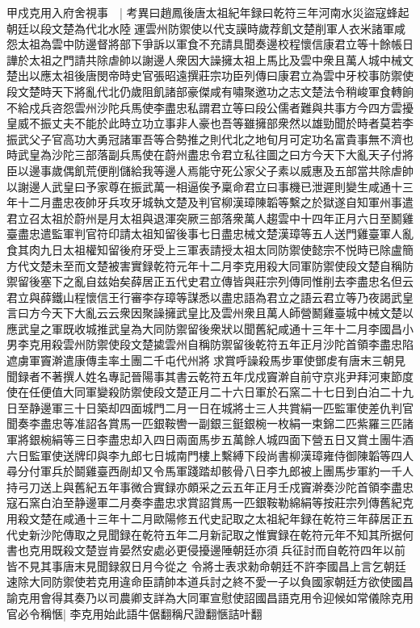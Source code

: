 甲戍克用入府舍視事　|{
	考異曰趙鳳後唐太祖紀年録曰乾符三年河南水災盜寇蜂起朝廷以段文楚為代北水陸運雲州防禦使以代支謨時歲荐飢文楚削軍人衣米諸軍咸怨太祖為雲中防邊督將部下爭訴以軍食不充請具聞奏邊校程懷信康君立等十餘帳日譁於太祖之門請共除虐帥以謝邊人衆因大譟擁太祖上馬比及雲中衆且萬人城中械文楚出以應太祖後唐閔帝時史官張昭遠撰莊宗功臣列傳曰康君立為雲中牙校事防禦使段文楚時天下將亂代北仍歲阻飢諸部豪傑咸有嘯聚邀功之志文楚法令稍峻軍食轉餉不給戍兵咨怨雲州沙陀兵馬使李盡忠私謂君立等曰段公儒者難與共事方今四方雲擾皇威不振丈夫不能於此時立功立事非人豪也吾等雖擁部衆然以雄勁聞於時者莫若李振武父子官高功大勇冠諸軍吾等合勢推之則代北之地旬月可定功名富貴事無不濟也時武皇為沙陀三部落副兵馬使在蔚州盡忠令君立私往圖之曰方今天下大亂天子付將臣以邊事歲偶飢荒便削儲給我等邊人焉能守死公家父子素以威惠及五部當共除虐帥以謝邊人武皇曰予家尊在振武萬一相逼俟予稟命君立曰事機已泄遲則變生咸通十三年十二月盡忠夜帥牙兵攻牙城執文楚及判官柳漢璋陳韜等繫之於獄遂自知軍州事遣君立召太祖於蔚州是月太祖與退渾突厥三部落衆萬人趨雲中十四年正月六日至鬭雞臺盡忠遣監軍判官符印請太祖知留後事七日盡忠械文楚漢璋等五人送門雞臺軍人亂食其肉九日太祖權知留後府牙受上三軍表請授太祖太同防禦使懿宗不悦時已除盧簡方代文楚未至而文楚被害實録乾符元年十二月李克用殺大同軍防禦使段文楚自稱防禦留後塞下之亂自兹始矣薛居正五代史君立傳皆與莊宗列傳同惟削去李盡忠名但云君立與薛鐵山程懷信王行審李存璋等謀悉以盡忠語為君立之語云君立等乃夜謁武皇言曰方今天下大亂云云衆因聚譟擁武皇比及雲州衆且萬人師營鬭雞臺城中械文楚以應武皇之軍既收城推武皇為大同防禦留後衆狀以聞舊紀咸通十三年十二月李國昌小男李克用殺雲州防禦使段文楚㨿雲州自稱防禦留後乾符五年正月沙陀首領李盡忠陷遮虜軍竇澣遣康傳圭率土團二千屯代州將求賞呼譟殺馬步軍使鄧䖍有唐末三朝見聞録者不著撰人姓名專記晉陽事其書云乾符五年戊戍竇澣自前守京兆尹拜河東節度使在任便值大同軍變殺防禦使段文楚正月二十六日軍於石窯二十七日到白泊二十九日至静邊軍三十日築却四面城門二月一日在城將士三人共賞絹一匹監軍使差仇判官聞奏李盡忠等准詔各賞馬一匹銀鞍轡一副銀三鋌銀椀一枚絹一束錦二匹紫羅三匹諸軍將銀椀絹等三日李盡忠却入四日兩面馬步五萬餘人城四面下營五日又賞土團牛酒六日監軍使送牌印與李九郎七日城南門樓上繫縛下段尚書柳漢璋雍侍御陳韜等四人尋分付軍兵於鬬雞臺西剮却又令馬軍踐踏却骸骨八日李九郎被上團馬步軍約一千人持弓刀送上與舊紀五年事微合實録亦頗采之云五年正月壬戍竇澣奏沙陀首領李盡忠寇石窯白泊至静邊軍二月奏李盡忠求賞詔賞馬一匹銀鞍勒綿絹等按莊宗列傳舊紀克用殺文楚在咸通十三年十二月歐陽修五代史記取之太祖紀年録在乾符三年薛居正五代史新沙陀傳取之見聞録在乾符五年二月新記取之惟實録在乾符元年不知其所据何書也克用既殺文楚豈肯晏然安處必更侵擾邊陲朝廷亦須兵征討而自乾符四年以前皆不見其事唐末見聞録叙日月今從之}
令將士表求勑命朝廷不許李國昌上言乞朝廷速除大同防禦使若克用違命臣請帥本道兵討之終不愛一子以負國家朝廷方欲使國昌諭克用會得其奏乃以司農卿支詳為大同軍宣慰使詔國昌語克用令迎候如常儀除克用官必令稱愜|{
	李克用始此語牛倨翻稱尺證翻愜詰叶翻}
